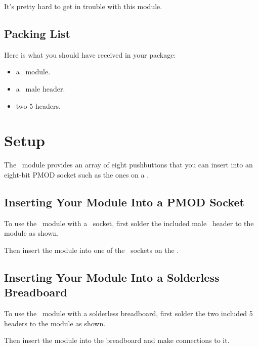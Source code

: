 \documentclass[letterpaper,11pt,oneside]{memoir}
\begin{document}
It's pretty hard to get in trouble with this module.

\section{Packing List}

Here is what you should have received in your package:

\begin{itemize}
	\item a \product\ module.
	\item a \digpmodtm\ male header.
	\item two 5 headers.
\end{itemize}


\chapter{Setup}

The \product\ module provides an array of eight pushbuttons that you can insert
into an eight-bit PMOD socket such as the ones on a \stickit. 

\section{Inserting Your Module Into a PMOD Socket}

To use the \product\ module with a \digpmod\ socket, first solder the included
male \digpmod\ header to the module as shown.


Then insert the module into one of the \digpmod\ sockets on the \stickit.


\section{Inserting Your Module Into a Solderless Breadboard}

To use the \product\ module with a solderless breadboard, first solder the two included
5 headers to the module as shown.


Then insert the module into the breadboard and make connections to it.

\end{document}
